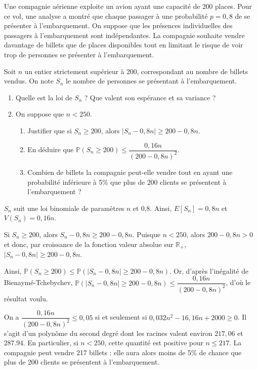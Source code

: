 \documentclass[11pt,fleqn, openany]{book} %
\begin{document}
\begin{exercise}Une compagnie aérienne exploite un avion ayant une capacité de 200 places. Pour ce vol, une analyse a montré que chaque passager à une probabilité $p=0,8$ de se présenter à l'embarquement. On suppose que les présences individuelles des passagers à l'embarquement sont indépendantes. La compagnie souhaite vendre davantage de billets que de places disponibles tout en limitant le risque de voir trop de personnes se présenter à l'embarquement.

Soit $n$ un entier strictement supérieur à 200, correspondant au nombre de billets vendus. On note $S_n$ le nombre de personnes se présentant à l'embarquement.
\begin{enumerate}
\item Quelle est la loi de $S_n$ ? Que valent son espérance et sa variance ?
\item On suppose que $n<250$. 
\begin{enumerate}
\item Justifier que si $S_n \geqslant 200$, alors $|S_n-0,8n| \geqslant 200-0,8n$.
\item En déduire que $\mathbb{P}(S_n \geqslant 200) \leqslant \dfrac{0,16n}{(200-0,8n)^2}$.
\item Combien de billets la compagnie peut-elle vendre tout en ayant une probabilité inférieure à 5\% que plus de 200 clients se présentent à l'embarquement ?
\end{enumerate}
\end{enumerate}
\newpage \end{exercise}

\begin{solution}$S_n$ suit une loi binomiale de paramètres $n$ et 0,8. Ainsi, $E[S_n]=0,8n$ et $V(S_n)=0,16n$.

Si $S_n \geqslant 200$, alors $S_n - 0,8n \geqslant 200-0,8n$. Puisque $n<250$, alors $200-0,8n >0$ et donc, par croissance de la fonction valeur absolue sur $\mathbb{R}_+$, $|S_n-0,8n| \geqslant 200-0,8n$.

Ainsi, $\mathbb{P}(S_n \geqslant 200) \leqslant \mathbb{P}(|S_n-0,8n| \geqslant 200-0,8n)$. Or, d'après l'inégalité de Bienaymé-Tchebychev, $\mathbb{P}(|S_n-0,8n| \geqslant 200-0,8n) \leqslant \dfrac{0,16n}{(200-0,8n)^2}$, d'où le résultat voulu.

On a $\dfrac{0,16n}{(200-0,8n)^2} \leqslant 0,05$ si et seulement si $0,032n^2-16,16n+2000 \geqslant 0$. Il s'agit d'un polynôme du second degré dont les racines valent environ $217,06$ et $287.94$. En particulier, si $n <250$, cette quantité est positive pour $n \leqslant 217$. La compagnie peut vendre 217 billets : elle aura alors moins de 5\% de chance que plus de 200 clients se présentent à l'embarquement.\end{solution}
\end{document}

